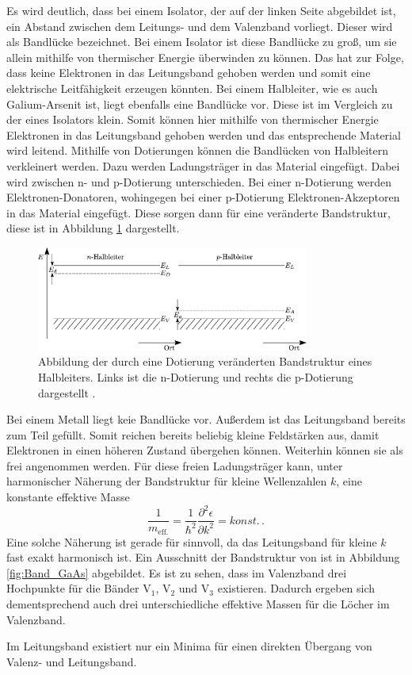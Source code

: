 Es wird deutlich, dass bei einem Isolator, der auf der linken Seite abgebildet ist, ein Abstand zwischen
dem Leitungs- und dem Valenzband vorliegt. Dieser wird als Bandlücke bezeichnet. Bei einem Isolator ist diese
Bandlücke zu groß, um sie allein mithilfe von thermischer Energie überwinden zu können. Das hat zur Folge,
dass keine Elektronen in das Leitungsband gehoben werden und somit eine elektrische Leitfähigkeit erzeugen könnten.
Bei einem Halbleiter, wie es auch Galium-Arsenit ist, liegt ebenfalls eine Bandlücke vor. Diese ist im Vergleich
zu der eines Isolators klein. Somit können hier mithilfe von thermischer Energie Elektronen in das Leitungsband
gehoben werden und das entsprechende Material wird leitend. Mithilfe von Dotierungen können die Bandlücken
von Halbleitern verkleinert werden. Dazu werden Ladungsträger in das Material eingefügt. Dabei wird zwischen
n- und p-Dotierung unterschieden. Bei einer n-Dotierung werden Elektronen-Donatoren, wohingegen bei einer p-Dotierung
Elektronen-Akzeptoren in das Material eingefügt. Diese sorgen dann für eine veränderte Bandstruktur, diese
ist in Abbildung \ref{fig:BS_neu} dargestellt. \\
\begin{figure}[H]
    \centering
    \includegraphics[width=0.8\textwidth]{images/BS_neu.png}
    \caption{Abbildung der durch eine Dotierung veränderten Bandstruktur eines Halbleiters. Links ist die n-Dotierung und rechts
    die p-Dotierung dargestellt \cite{BS_neu}.}
    \label{fig:BS_neu}
\end{figure} \noindent
Bei einem Metall liegt keie Bandlücke vor. Außerdem ist das Leitungsband bereits zum Teil gefüllt. Somit reichen
bereits beliebig kleine Feldstärken aus, damit Elektronen in einen höheren Zustand übergehen können. Weiterhin
können sie als frei angenommen werden.
Für diese freien Ladungsträger kann, unter harmonischer Näherung der Bandstruktur für kleine Wellenzahlen $k$, eine konstante effektive Masse
\begin{equation}
  \frac{1}{m_\text{eff.}} = \frac{1}{\hbar^2}\frac{\partial^2 \epsilon}{\partial k^2} = konst. \, .
\end{equation}
Eine solche Näherung ist gerade für  sinnvoll, da das Leitungsband für kleine $k$ fast exakt harmonisch ist.
Ein Ausschnitt der Bandstruktur von  ist in Abbildung \ref{fig:Band_GaAs} abgebildet.
Es ist zu sehen, dass im Valenzband drei Hochpunkte für die Bänder V$_1$, V$_2$ und V$_3$ existieren.
Dadurch ergeben sich dementsprechend auch drei unterschiedliche effektive Massen für die Löcher im Valenzband.\par
Im Leitungsband existiert nur ein Minima für einen direkten Übergang von Valenz- und Leitungsband.


